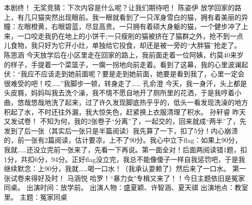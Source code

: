 {}本剧终！\markdownRendererInterblockSeparator
{}无奖竞猜：下次内容是什么呢？让我们期待吧！\markdownRendererInterblockSeparator
{}\markdownRendererInterblockSeparator
{}陈姿伊\markdownRendererInterblockSeparator
{}放学回家的路上，有几只猫突然出现眼前。我一眼就看到了一只浑身雪白的猫，拥有着美丽的异瞳：左眼橙黄，右眼碧蓝，尽显高贵。一只拥有着硕大身躯的猫，一个健步冲了上来，一口咬走我扔在地上的小饼干;一只瘦削的猫被挤在了猫群之外，抢不到一点儿食物，我只好为它开小灶，单独给它投食，却还是被一旁的“大胖猫”抢走了。 \markdownRendererInterblockSeparator
{}\markdownRendererInterblockSeparator
{}陈思涵\markdownRendererInterblockSeparator
{}今天放学后在小区里走在回家的路上，我前面走着一位阿姨，约莫40来岁的样子，手提着一个菜篮子，一瘸一拐地向前走着。看到了这幕，我的心里波澜起伏：“我应不应该走到她前面呢？要是走到她前面，她要是看到我了，心里一定会很难受的吧！哎……”我脚步一顿，转身走了……\markdownRendererInterblockSeparator
{}\markdownRendererInterblockSeparator
{}孔俞澄\markdownRendererInterblockSeparator
{}今天，我一身汗，头上都是头皮屑，妈妈叫我去洗个澡，我不情不愿自地开了厕所里的花洒，于是我哼着小曲，悠哉悠哉地洗了起来，过了许久发现脚底热乎乎的，低头一看发现洗澡的地方积起了水，不时还往外漏，我大惊失色，赶紧换上衣服清理了积水。\markdownRendererInterblockSeparator
{}\markdownRendererInterblockSeparator
{}孙轩睿\markdownRendererInterblockSeparator
{}昨天又发试卷！\markdownRendererInterblockSeparator
{}不知为何，我的2张卷子“分离”了，一起交的，回来就成“两半”了，先发到了后一张（其实后一张只是半篇阅读）我先算了一下，扣了5分！内心崩溃的，前一张有2篇阅读，估计要凉，上不了90分。我心中立下flag：如果上90分，我就……还没立完前一张来了，先看一下再说。第一面全对！后面两阅读错1题，扣1分，共扣6分，94分。正好flag没立完，我总不能像傻子一样自我惩罚吧，于是我继续默念：上90分，我就……喝一口水！（我承认耍赖了）然后来了一口水。\markdownRendererInterblockSeparator
{}第一张试卷来得好及时！\markdownRendererInterblockSeparator
{}\markdownRendererInterblockSeparator
{}马涵悦\markdownRendererInterblockSeparator
{}哈罗！“暴力女"专楫又来了！！今日主题依旧是冤家同桌。\markdownRendererInterblockSeparator
{}出演时间：放学前。 出演人物：盛夏颖、许智涵、夏天祺 \markdownRendererInterblockSeparator
{}出演地点：教室里。 主题：冤家同桌 \markdownRendererInterblockSeparator
